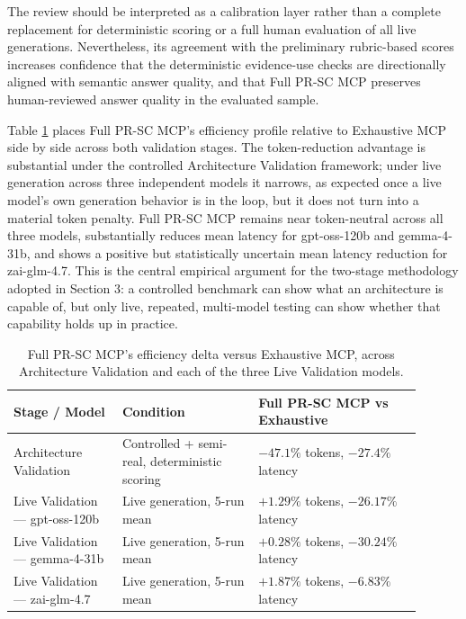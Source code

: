 The review should be interpreted as a calibration layer rather than a complete replacement for deterministic scoring or a full human evaluation of all live generations. Nevertheless, its agreement with the preliminary rubric-based scores increases confidence that the deterministic evidence-use checks are directionally aligned with semantic answer quality, and that Full PR-SC MCP preserves human-reviewed answer quality in the evaluated sample.

Table \ref{tab:summary} places Full PR-SC MCP's efficiency profile relative to Exhaustive MCP side by side across both validation stages. The token-reduction advantage is substantial under the controlled Architecture Validation framework; under live generation across three independent models it narrows, as expected once a live model's own generation behavior is in the loop, but it does not turn into a material token penalty. Full PR-SC MCP remains near token-neutral across all three models, substantially reduces mean latency for gpt-oss-120b and gemma-4-31b, and shows a positive but statistically uncertain mean latency reduction for zai-glm-4.7. This is the central empirical argument for the two-stage methodology adopted in Section 3: a controlled benchmark can show what an architecture is capable of, but only live, repeated, multi-model testing can show whether that capability holds up in practice.

\begin{table}[!t]
  \caption{Full PR-SC MCP's efficiency delta versus Exhaustive MCP, across Architecture Validation and each of the three Live Validation models.}
  \label{tab:summary}
  \begin{tabular}{p{0.24\linewidth}p{0.30\linewidth}p{0.36\linewidth}}
    \toprule
    \textbf{Stage / Model} & \textbf{Condition} & \textbf{Full PR-SC MCP vs Exhaustive} \\
    \midrule
    Architecture Validation & Controlled + semi-real, deterministic scoring & $-47.1\%$ tokens, $-27.4\%$ latency \\
    Live Validation --- gpt-oss-120b & Live generation, 5-run mean & $+1.29\%$ tokens, $-26.17\%$ latency \\
    Live Validation --- gemma-4-31b & Live generation, 5-run mean & $+0.28\%$ tokens, $-30.24\%$ latency \\
    Live Validation --- zai-glm-4.7 & Live generation, 5-run mean & $+1.87\%$ tokens, $-6.83\%$ latency \\
    \bottomrule
  \end{tabular}
\end{table}

